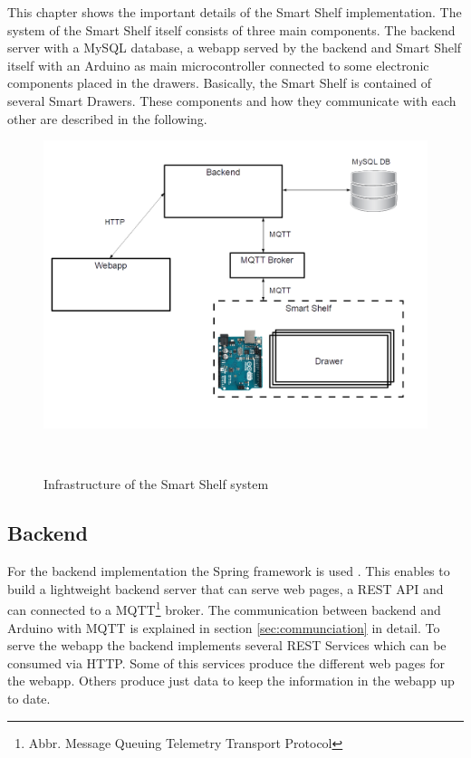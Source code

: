 This chapter shows the important details of the Smart Shelf implementation. 
The system of the Smart Shelf itself consists of three main components. 
The backend server with a MySQL database, a webapp served by the backend and Smart Shelf itself with an Arduino as main microcontroller connected to some electronic components placed in the drawers. 
Basically, the Smart Shelf is contained of several Smart Drawers. 
These components and how they communicate with each other are described in the following. 
%
\begin{figure}
	\centering
	\includegraphics[width=1.3\columnwidth]{figures/infrastructure-smartshelf-white.png}
	\caption{Infrastructure of the Smart Shelf system}~\label{fig:infrastructure}
\end{figure}
%

\subsection{Backend}
For the backend implementation the Spring framework is used \cite{springframework}. 
This enables to build a lightweight backend server that can serve web pages, a REST API and can connected to a MQTT\footnote{Abbr. Message Queuing Telemetry Transport Protocol} broker. 
The communication between backend and Arduino with MQTT is explained in section \ref{sec:communciation} in detail. 
To serve the webapp the backend implements several REST Services which can be consumed via HTTP. 
Some of this services produce the different web pages for the webapp. 
Others produce just data to keep the information in the webapp up to date. 

